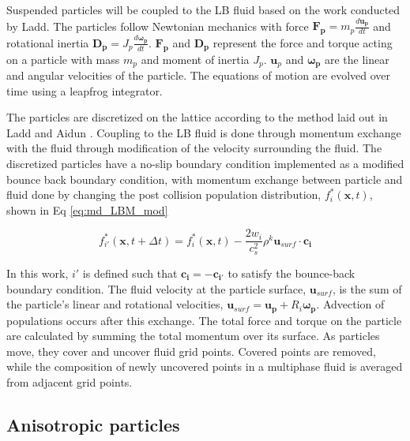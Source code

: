 Suspended particles will be coupled to the LB fluid based on the work conducted by Ladd. \cite{ladd_numerical_1994, 
aidun_direct_1998, ladd_lattice-boltzmann_2001} The particles follow Newtonian mechanics with force 
$\mathbf{F_p} = m_p\frac{d \mathbf{u_p} }{dt}$ and rotational inertia $\mathbf{D_p} = J_p \frac{d \mathbf{\omega_{p}}}{dt}$. 
$\mathbf{F_p}$ and $\mathbf{D_p}$ represent the force and torque acting on a particle with mass $m_p$ and moment of inertia 
$J_p$. $\mathbf{u}_p$ and $\mathbf{\omega_{p}}$ are the linear and angular velocities of the particle. The equations of 
motion are evolved over time using a leapfrog integrator. \cite{jansen_bijels_2011}

The particles are discretized on the lattice according to the method laid out in Ladd and Aidun 
\cite{ladd_lattice-boltzmann_2001}. Coupling to the LB fluid is done through momentum exchange with the 
fluid through modification of the velocity surrounding the fluid. The discretized particles have a no-slip 
boundary condition implemented as a modified bounce back boundary condition, with momentum exchange between 
particle and fluid done by changing the post collision population distribution, $f^{*}_{i}(\mathbf{x}, t)$, 
shown in Eq \ref{eq:md_LBM_mod}

\begin{equation}
    f^{*}_{i'}(\mathbf{x}, t + \Delta t) = f^{*}_{i}(\mathbf{x}, t) - \frac{2 w_{i}}{c_s^2}\rho^k \mathbf{u}_{surf} 
    \cdot \mathbf{c_i}
    \label{eq:md_LBM_mod}
\end{equation}

In this work, $i'$ is defined such that $\mathbf{c_i} = -\mathbf{c_{i'}}$ to satisfy the bounce-back boundary condition. 
The fluid velocity at the particle surface, $\mathbf{u}_{surf}$, is the sum of the particle's linear and rotational 
velocities, $\mathbf{u}_{surf} = \mathbf{u_p} + R_i\mathbf{\omega_p}$. Advection of populations occurs after this exchange. 
The total force and torque on the particle are calculated by summing the total momentum over its surface. As particles 
move, they cover and uncover fluid grid points. Covered points are removed, while the composition of newly uncovered 
points in a multiphase fluid is averaged from adjacent grid points. 

\subsection{Anisotropic particles}
\label{section:lbm_colloids_ellipsoids}

